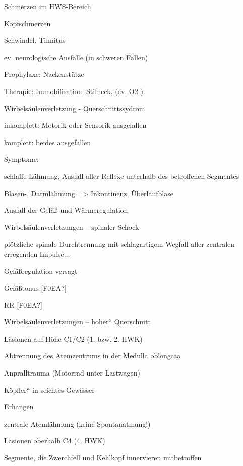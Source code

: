\documentclass{article}
\begin{document}
{\mdseries
Schmerzen im HWS-Bereich}

{\mdseries
Kopfschmerzen}

{\mdseries
Schwindel, Tinnitus}

{\mdseries
ev. neurologische Ausf\"alle (in schweren F\"allen)}

{\mdseries
Prophylaxe: Nackenst\"utze}

{\mdseries
Therapie: Immobilisation, Stifneck, (ev. O2 )}

{\mdseries
Wirbels\"aulenverletzung -  Querschnittssydrom}

{\mdseries
inkomplett: Motorik oder Sensorik  ausgefallen}

{\mdseries
komplett: beides ausgefallen}

{\mdseries
Symptome:}

{\mdseries
schlaffe L\"ahmung, Ausfall aller Reflexe  unterhalb des betroffenen
Segmentes}

{\mdseries
Blasen-, Darml\"ahmung ={\textgreater} Inkontinenz,  \"Uberlaufblase}

{\mdseries
Ausfall der Gef\"a{\ss}-und W\"armeregulation}

{\mdseries
Wirbels\"aulenverletzungen -- spinaler  Schock}

{\mdseries
pl\"otzliche spinale Durchtrennung mit  schlagartigem Wegfall aller
zentralen  erregenden Impulse...}

{\mdseries
Gef\"a{\ss}regulation versagt}

{\mdseries
Gef\"a{\ss}tonus [F0EA?]}

{\mdseries
RR [F0EA?]  }

{\mdseries
Wirbels\"aulenverletzungen -- {\quotedblbase}hoher{\textquotedblleft} 
Querschnitt}

{\mdseries
L\"asionen auf H\"ohe C1/C2 (1. bzw. 2.  HWK)}

{\mdseries
Abtrennung des Atemzentrums in der Medulla  oblongata}

{\mdseries
Anpralltrauma (Motorrad unter Lastwagen)}

{\mdseries
{\quotedblbase}K\"opfler{\textquotedblleft} in seichtes Gew\"asser}

{\mdseries
Erh\"angen}

{\mdseries
zentrale Ateml\"ahmung (keine  Spontanatmung!)}

{\mdseries
L\"asionen oberhalb C4 (4. HWK)}

{\mdseries
Segmente, die Zwerchfell und Kehlkopf  innervieren mitbetroffen}
\end{document}
